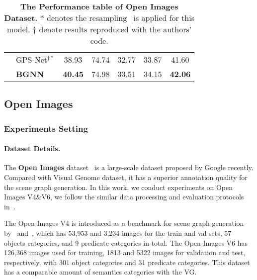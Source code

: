 \begin{table}[]
{\begin{tabular}{l|l|cc|cc|c}
                            & GPS-Net$^{\dagger*}$ & 38.93 &74.74 & 32.77  &33.87 & 41.60    \\ \cmidrule{2-7} 
                            & \textbf{BGNN}    & \textbf{40.45} & 74.98  & 33.51    & 34.15   & \textbf{42.06}     \\ 
                            \bottomrule
        \end{tabular}
    }
    \caption{\textbf{The Performance table of Open Images Dataset.} 
    $*$ denotes the resampling~\cite{gupta_lvis:_2019} is applied for this model.
    $\dagger$ denote results reproduced with the authors' code. } 
    \label{tab:openimage}
    \vspace{-0.4cm}
\end{table}


\subsection{Open Images} \label{lab:oi_exp}

\subsubsection{Experiments Setting}

\paragraph{Dataset Details.} 

The \textbf{Open Images} dataset~\cite{OpenImages} is a large-scale dataset proposed by Google recently. Compared with Visual Genome dataset, it has a superior annotation quality for the scene graph generation. In this work, we conduct experiments on Open Images  V4\&V6, we follow the similar data processing and evaluation protocols in~\cite{zhang_graphical_2019, OpenImages, lin_gps-net_2020}. 

The Open Images V4 is introduced as a benchmark for scene graph generation by~\cite{zhang_graphical_2019} and~\cite{lin_gps-net_2020}, which has 53,953 and 3,234 images for the train and val sets, 57 objects categories, and 9 predicate categories in total.
The Open Images V6 has 126,368 images used for training, 1813 and 5322 images for validation and test, respectively, with 301 object categories and 31 predicate categories. 
This dataset has a comparable amount of semantics categories with the VG.

